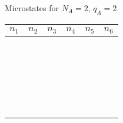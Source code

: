 \documentclass[english]{article}
\newcommand{\hi}{\rule[-2mm]{0mm}{6mm}}
\begin{document}
\begin{center}

\LARGE

Microstates for $N_A=2$, $q_A=2$

\bigskip

\begin{tabular}{|p{0.5in}|p{0.5in}|p{0.5in}|p{0.5in}|p{0.5in}|p{0.5in}|} \hline 
\hi \hfil $n_1$ \hfil &\hfil $n_2$\hfil &\hfil $n_3$\hfil &\hfil $n_4$\hfil &\hfil $n_5$\hfil &\hfil $n_6$\hfil \\[2pt] \hline
\hi       &       &       &       &       &       \\[2pt] \hline
\hi       &       &       &       &       &       \\[2pt] \hline
\hi       &       &       &       &       &       \\[2pt] \hline
\hi       &       &       &       &       &       \\[2pt] \hline
\hi       &       &       &       &       &       \\[2pt] \hline
\hi       &       &       &       &       &       \\[2pt] \hline
\hi       &       &       &       &       &       \\[2pt] \hline
\hi       &       &       &       &       &       \\[2pt] \hline
\hi       &       &       &       &       &       \\[2pt] \hline
\hi       &       &       &       &       &       \\[2pt] \hline
\hi       &       &       &       &       &       \\[2pt] \hline
\hi       &       &       &       &       &       \\[2pt] \hline
\hi       &       &       &       &       &       \\[2pt] \hline
\hi       &       &       &       &       &       \\[2pt] \hline
\hi       &       &       &       &       &       \\[2pt] \hline
\hi       &       &       &       &       &       \\[2pt] \hline
\hi       &       &       &       &       &       \\[2pt] \hline
\hi       &       &       &       &       &       \\[2pt] \hline
\hi       &       &       &       &       &       \\[2pt] \hline
\hi       &       &       &       &       &       \\[2pt] \hline
\hi       &       &       &       &       &       \\[2pt] \hline
\hi       &       &       &       &       &       \\[2pt] \hline
\hi       &       &       &       &       &       \\[2pt] \hline
\end{tabular}
\end{center}
\end{document}
